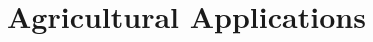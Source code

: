 \documentclass[../main]{subfiles}
\begin{document}
\chapter{Agricultural Applications} \label{chp:}
\end{document}
